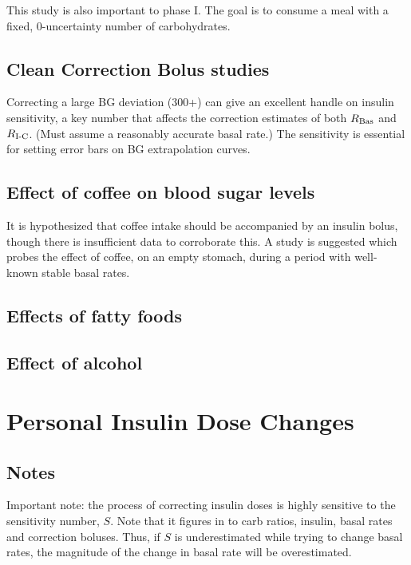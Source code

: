 This study is also important to phase I. The goal is to consume a meal with a fixed, 0-uncertainty 
number of carbohydrates.

\subsection{Clean Correction Bolus studies}

Correcting a large BG deviation (300+) can give an excellent handle on insulin sensitivity, a key 
number that affects the correction estimates of both $R_\text{Bas}$ and $R_\text{I-C}$. (Must assume a reasonably 
accurate basal rate.) The sensitivity is essential for setting error bars on BG extrapolation curves.

\subsection{Effect of coffee on blood sugar levels}

It is hypothesized that coffee intake should be accompanied by an insulin bolus, though there is 
insufficient data to corroborate this. A study is suggested which probes the effect of coffee, on an 
empty stomach, during a period with well-known stable basal rates.

\subsection{Effects of fatty foods}

\subsection{Effect of alcohol}

\section{Personal Insulin Dose Changes}

\subsection{Notes}

Important note: the process of correcting insulin doses is highly sensitive to the sensitivity number, 
$S$. Note that it figures in to carb ratios, insulin, basal rates and correction boluses. Thus, if 
$S$ is underestimated while trying to change basal rates, the magnitude of the change in basal rate 
will be overestimated.

